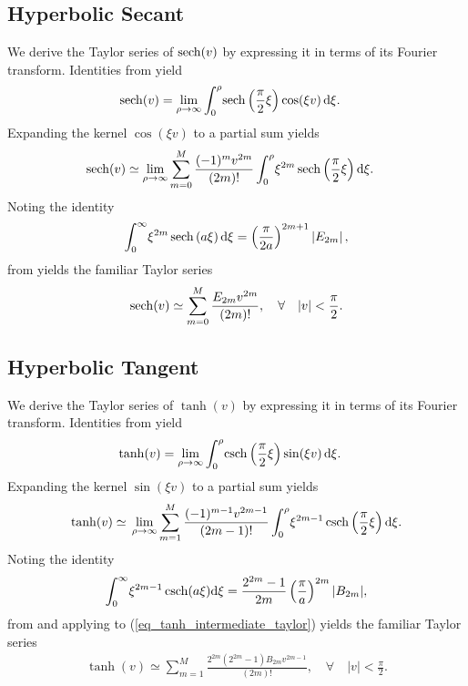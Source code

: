 \subsection{Hyperbolic Secant}
We derive the Taylor series of $\operatorname{sech}(v)$ by expressing
it in terms of its Fourier transform. Identities from
\cite{bateman_integral} yield
\begin{align}
    \operatorname{sech}(v) &= \lim_{\rho \to \infty}
    \int_0^\rho \!
    \operatorname{sech}\left(\frac{\pi}{2}\xi\right)\cos(\xi v) \,
    \mathrm{d}\xi.
\end{align}
Expanding the kernel $\cos(\xi v)$ to a partial sum yields
\begin{align}
	\operatorname{sech}(v) &\simeq
	\lim_{\rho \to \infty}
	\sum_{m=0}^{M}
	\frac{(-1)^m v^{2 m}}{(2 m)!}
	\int_0^\rho \!
	\xi^{2 m}\operatorname{sech}\left(\frac{\pi}{2}\xi\right)
	\mathrm{d}\xi. \label{eq_sech_intermediate_taylor}
\end{align}
Noting the identity
\begin{align}
\int_0^\infty \!
\xi^{2 m} \operatorname{sech}\left(a \xi\right)
\mathrm{d}\xi =
\left(\frac{\pi}{2a}\right)^{2m + 1}
\left|E_{2m}\right|,
\end{align}
from \cite{gradshtein_table_2007} yields the familiar Taylor series
\begin{align}
	\operatorname{sech}(v) \simeq
	\sum_{m=0}^{M}\frac{E_{2 m} v^{2 m}}{(2 m)!},
	\quad \forall \quad |v| < \frac{\pi}{2}.
\end{align}

\subsection{Hyperbolic Tangent}
We derive the Taylor series of $\tanh(v)$ by expressing
it in terms of its Fourier transform. Identities from
\cite{bateman_integral} yield
\begin{align}
	\tanh(v) &= \lim_{\rho \to \infty}
	\int_0^\rho \!
	\operatorname{csch}\left(\frac{\pi}{2}\xi\right)\sin(\xi v) \,
	\mathrm{d}\xi.
\end{align}
Expanding the kernel $\sin(\xi v)$ to a partial sum yields
\begin{equation}
	\tanh(v) \simeq \\
	\lim_{\rho \to \infty}
	\sum_{m=1}^{M}
	\frac{(-1)^{m-1} v^{2 m - 1}}{(2 m - 1)!}
	\int_0^\rho \!
	\xi^{2 m - 1}\operatorname{csch}\left(\frac{\pi}{2}\xi\right)
	\mathrm{d}\xi.  \label{eq_tanh_intermediate_taylor}
\end{equation}
Noting the identity
\begin{equation}
	\begin{split}
		\int_0^{\infty} \! \xi^{2 m - 1} \operatorname{csch}(a \xi) \mathrm{d}\xi = 
		\frac{2^{2 m} - 1}{2 m}
		\left(\frac{\pi}{a}\right)^{2m}
		|B_{2m}|,
	\end{split}
\end{equation}
from \cite{gradshtein_table_2007} and applying to (\ref{eq_tanh_intermediate_taylor})
yields the familiar Taylor series
\begin{equation}
	\begin{split}
		\tanh(v) \simeq
		\sum_{m=1}^{M}\frac{2^{2m}(2^{2m}-1)B_{2m}v^{2m-1}}{(2m)!},
		\quad \forall \quad |v| < \frac{\pi}{2}.
	\end{split}
\end{equation}

